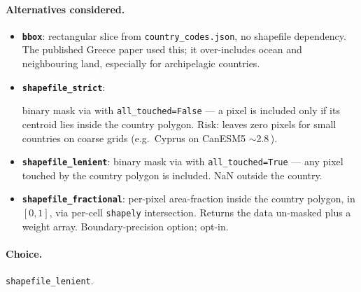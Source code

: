 \documentclass[11pt,a4paper]{article}
\begin{document}
\paragraph{Alternatives considered.}
\begin{itemize}
  \item \textbf{\texttt{bbox}}: rectangular slice from
        \texttt{country\_codes.json}, no shapefile dependency. The published
        Greece paper used this; it over-includes ocean and neighbouring land,
        especially for archipelagic countries.
  \item \textbf{\texttt{shapefile\_strict}}: \begin{sloppypar}binary mask via
         with
        \texttt{all\_touched=False} --- a pixel is included only if its
        centroid lies inside the country polygon. Risk: leaves zero pixels
        for small countries on coarse grids (e.g.\ Cyprus on CanESM5
        $\sim$2.8\,\textdegree).\end{sloppypar}
  \item \textbf{\texttt{shapefile\_lenient}}: binary mask via
         with
        \texttt{all\_touched=True} --- any pixel touched by the country
        polygon is included. NaN outside the country.
  \item \textbf{\texttt{shapefile\_fractional}}: per-pixel area-fraction
        inside the country polygon, in $[0, 1]$, via per-cell
        \texttt{shapely} intersection. Returns the data un-masked plus a
        weight array. Boundary-precision option; opt-in.
\end{itemize}

\paragraph{Choice.} \texttt{shapefile\_lenient}.
\end{document}
